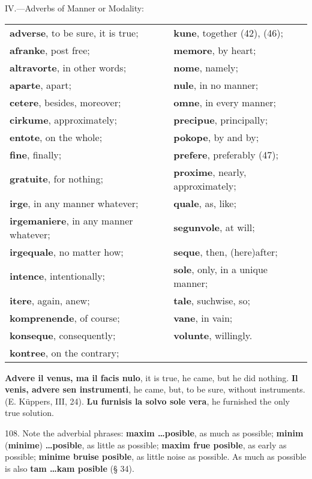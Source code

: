 \begin{center}IV.—Adverbs of Manner or Modality:\end{center}
\begin{tabular}{l l}
\textbf{adverse}, to be sure, it is true; & \textbf{kune}, together (42), (46); \\
\textbf{afranke}, post free; & \textbf{memore}, by heart; \\
\textbf{altravorte}, in other words; & \textbf{nome}, namely; \\
\textbf{aparte}, apart; & \textbf{nule}, in no manner; \\
\textbf{cetere}, besides, moreover; & \textbf{omne}, in every manner; \\
\textbf{cirkume}, approximately; & \textbf{precipue}, principally; \\
\textbf{entote}, on the whole; & \textbf{pokope}, by and by; \\
\textbf{fine}, finally; & \textbf{prefere}, preferably (47); \\
\textbf{gratuite}, for nothing; & \textbf{proxime}, nearly, approximately; \\
\textbf{irge}, in any manner whatever; & \textbf{quale}, as, like; \\
\textbf{irgemaniere}, in any manner whatever; & \textbf{segunvole}, at will; \\
\textbf{irgequale}, no matter how; & \textbf{seque}, then, (here)after; \\
\textbf{intence}, intentionally; & \textbf{sole}, only, in a unique manner; \\
\textbf{itere}, again, anew; & \textbf{tale}, suchwise, so; \\
\textbf{komprenende}, of course; & \textbf{vane}, in vain; \\
\textbf{konseque}, consequently; & \textbf{volunte}, willingly. \\
\textbf{kontree}, on the contrary; &
\end{tabular}

\textbf{Advere il venus, ma il facis nulo}, it is true, he came, but he did nothing. \textbf{Il venis, advere sen instrumenti}, he came, but, to be sure, without instruments. (E. Küppers, III, 24). \textbf{Lu furnisis la solvo sole vera}, he furnished the only true solution.

108. Note the adverbial phrases: \textbf{maxim \ldots posible}, as much as possible; \textbf{minim }(\textbf{minime})\textbf{ \ldots posible}, as little as possible; \textbf{maxim frue posible}, as early as possible; \textbf{minime bruise posible}, as little noise as possible. As much as possible is also \textbf{tam \ldots kam posible} (§ 34).

